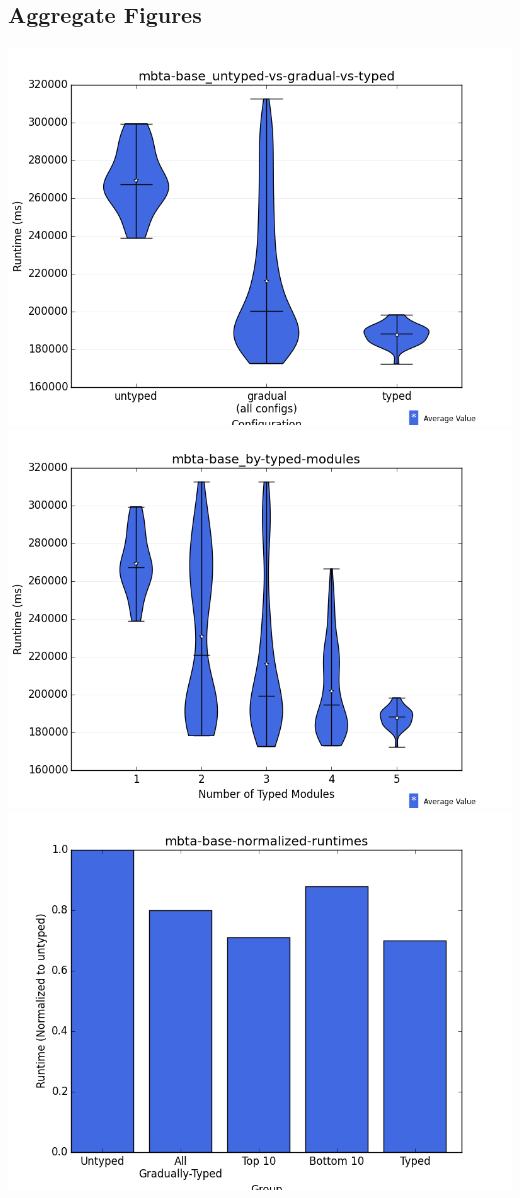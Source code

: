 \documentclass{article}
\begin{document}
\subsection{Aggregate Figures}
\includegraphics[width=\textwidth]{mbta-base_untyped-vs-gradual-vs-typed-violin.png}
\includegraphics[width=\textwidth]{mbta-base_by-typed-modules-violin.png}
\includegraphics[width=\textwidth]{mbta-base-normalized-runtimes-bar.png}
\end{document}
